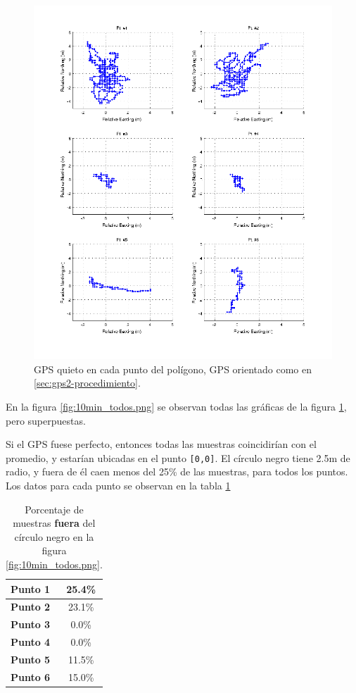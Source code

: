 \documentclass[spanish,12pt,a4paper,titlepage]{report}
\begin{document}
\begin{figure}[h!]
  \includegraphics[width=1.1\textwidth]{./img/10min_grid.png}
  \caption{GPS quieto en cada punto del polígono, GPS orientado como en \ref{sec:gps2-procedimiento}.}
  \label{fig:10min_grid.png}
\end{figure}

\newpage
En la figura \ref{fig:10min_todos.png} se observan todas las gráficas de la figura \ref{fig:10min_grid.png}, pero superpuestas.

Si el GPS fuese perfecto, entonces todas las muestras coincidirían con el promedio, y estarían ubicadas en el punto \verb+[0,0]+. El círculo negro tiene 2.5m de radio, y fuera de él caen menos del 25\% de las muestras, para todos los puntos. Los datos para cada punto se observan en la tabla \ref{tab:fuera_del_circulo_10m}

\begin{table}[H]
\begin{center}
\begin{tabular}{|l|c|}
\hline
\textbf{Punto 1} & 25.4\% \\
\hline
\textbf{Punto 2} & 23.1\% \\
\hline
\textbf{Punto 3} & 0.0\% \\
\hline
\textbf{Punto 4} & 0.0\% \\
\hline
\textbf{Punto 5} & 11.5\% \\
\hline
\textbf{Punto 6} & 15.0\% \\
\hline
\end{tabular} 
\caption{Porcentaje de muestras \textbf{fuera} del círculo negro en la figura \ref{fig:10min_todos.png}.}
\label{tab:fuera_del_circulo_10m}
\end{center}
\end{table}
\end{document}

